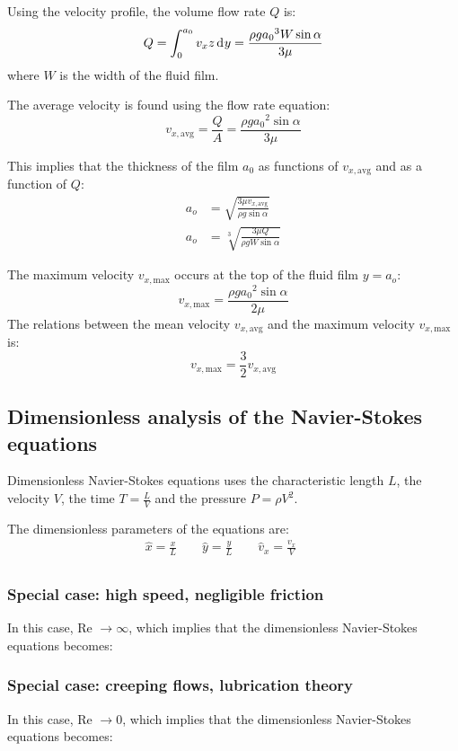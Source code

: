 \documentclass[10pt, twocolumn]{article}
\begin{document}
Using the velocity profile, the volume flow rate \(Q\) is:
\[
  Q = \int_0^{a_0}{v_x z \,\mathrm{d}^{} y} = \frac{\rho g {a_0}^3 W \sin\alpha}{3\mu}
\]
where \(W\) is the width of the fluid film.

The average velocity is found using the flow rate equation:
\[
  v_{x,\mathrm{avg}} = \frac{Q}{A} = \frac{\rho g {a_0}^2 \sin\alpha}{3\mu}
\]

This implies that the thickness of the film \(a_0\) as functions of \(v_{x,\mathrm{avg}}\) and as a function of \(Q\):
\begin{align}
  a_o & = \sqrt{\frac{3\mu v_{x,\mathrm{avg}}}{\rho g \sin\alpha}} \\
  a_o & = \sqrt[3]{\frac{3\mu Q}{\rho g W \sin\alpha}}
\end{align}

The maximum velocity \(v_{x,\mathrm{max}}\) occurs at the top of the fluid film \(y = a_o\):
\[
  v_{x,\mathrm{max}} = \frac{\rho g {a_0}^2 \sin\alpha}{2\mu}
\]
The relations between the mean velocity \(v_{x,\mathrm{avg}}\) and the maximum velocity \(v_{x,\mathrm{max}}\) is:
\[
  v_{x,\mathrm{max}} = \frac{3}{2} v_{x,\mathrm{avg}}
\]


\subsection{Dimensionless analysis of the Navier-Stokes equations}

Dimensionless Navier-Stokes equations uses the characteristic length \(L\), the velocity \(V\), the time \(T = \frac{L}{V}\) and the pressure \(P = \rho V^2\).

The dimensionless parameters of the equations are:
\begin{align*}
  \hat{x} = \frac{x}{L} \qquad \hat{y} = \frac{y}{L} \qquad \hat{v}_x = \frac{v_x}{V} \qquad \\
\end{align*}



\subsubsection{Special case: high speed, negligible friction}
In this case, Re \(\to \infty\), which implies that the dimensionless Navier-Stokes equations becomes:



\subsubsection{Special case: creeping flows, lubrication theory}
In this case, Re \(\to 0\), which implies that the dimensionless Navier-Stokes equations becomes:
\end{document}
